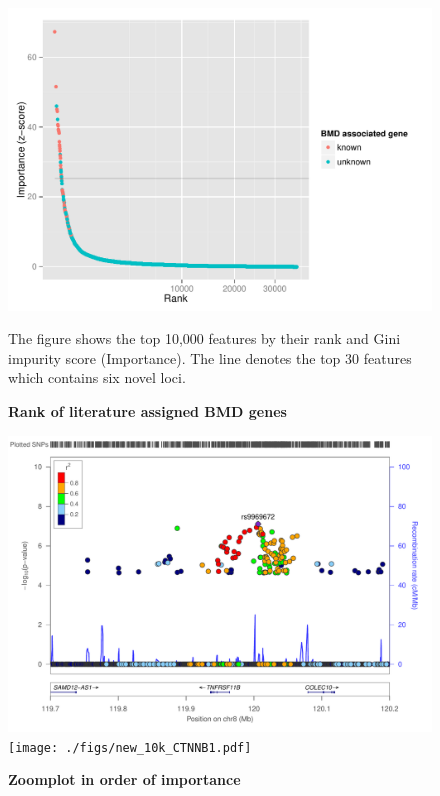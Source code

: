 \documentclass[11pt]{article}
\begin{document}
\begin{figure}[tbhp]
    \caption{\textbf{Rank of literature assigned BMD genes}}
    \label{figure:knowngeneranks}
    \includegraphics{./figs/BMDTop10K.pdf}
    \begin{flushleft}
      The figure shows the top 10,000 features by their rank and Gini impurity score (Importance). The line denotes the top 30 features which contains six novel loci. 
     \end{flushleft}
\end{figure}




\begin{figure}[tbhp]
    \caption{\textbf{Zoomplot in order of importance}}
    \label{figure:knowngeneranks}
    \includegraphics{./figs/new_10k_TNFRSF11B.pdf}
     \texttt{[image: ./figs/new\_10k\_CTNNB1.pdf]}
    \begin{flushleft}
     \end{flushleft}
\end{figure}
\end{document}
